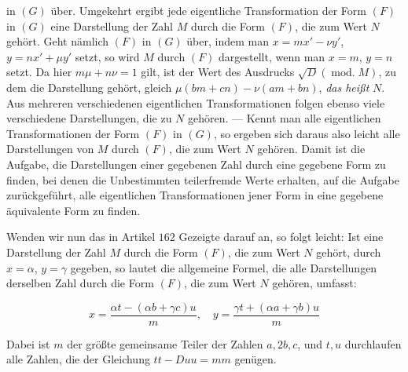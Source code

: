 in $(G)$ über. Umgekehrt ergibt jede eigentliche Transformation der Form $(F)$ in $(G)$ eine Darstellung der Zahl $M$ durch die Form $(F)$, die zum Wert $N$ gehört. Geht nämlich $(F)$ in $(G)$ über, indem man $x=mx'-\nu y'$, $y=nx'+\mu y'$ setzt, so wird $M$ durch $(F)$ dargestellt, wenn man $x=m$, $y=n$ setzt. Da hier $m\mu+n\nu=1$ gilt, ist der Wert des Ausdrucks $\surd D(\operatorname{mod.}M)$, zu dem die Darstellung gehört, gleich $\mu(bm+cn)-\nu(am+bn)$, \emph{das heißt} $N$. Aus mehreren verschiedenen eigentlichen Transformationen folgen ebenso viele verschiedene Darstellungen, die zu $N$ gehören. --- Kennt man alle eigentlichen Transformationen der Form $(F)$ in $(G)$, so ergeben sich daraus also leicht alle Darstellungen von $M$ durch $(F)$, die zum Wert $N$ gehören. Damit ist die Aufgabe, die Darstellungen einer gegebenen Zahl durch eine gegebene Form zu finden, bei denen die Unbestimmten teilerfremde Werte erhalten, auf die Aufgabe zurückgeführt, alle eigentlichen Transformationen jener Form in eine gegebene äquivalente Form zu finden.

Wenden wir nun das in Artikel $162$ Gezeigte darauf an, so folgt leicht: Ist eine Darstellung der Zahl $M$ durch die Form $(F)$, die zum Wert $N$ gehört, durch $x=\alpha$, $y=\gamma$ gegeben, so lautet die allgemeine Formel, die alle Darstellungen derselben Zahl durch die Form $(F)$, die zum Wert $N$ gehören, umfasst:

\[
x=\frac{\alpha t-(\alpha b+\gamma c)u}{m},\quad y=\frac{\gamma t+(\alpha a+\gamma b)u}{m}
\]

Dabei ist $m$ der größte gemeinsame Teiler der Zahlen $a,2b,c$, und $t,u$ durchlaufen alle Zahlen, die der Gleichung $tt-Duu=mm$ genügen.


